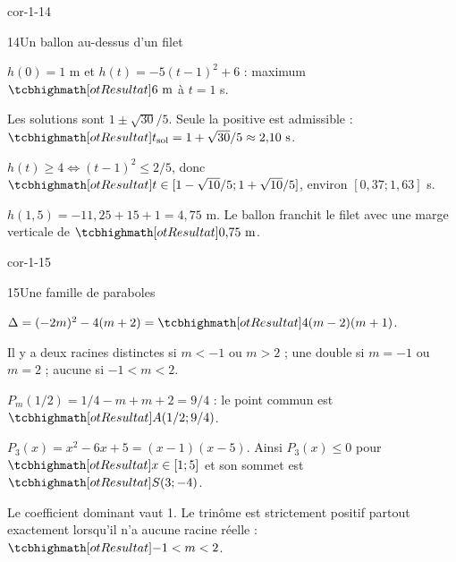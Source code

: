 \begin{blocLivre}{cor-1-14}
\begin{corrige}{14}{Un ballon au-dessus d'un filet}
\begin{questions}
\item $h(0)=1$ m et $h(t)=-5(t-1)^2+6$ : maximum $\res{6\text{ m}}$ à $t=1$ s.
\item Les solutions sont $1\pm\sqrt{30}/5$. Seule la positive est admissible :
$\res{t_{\text{sol}}=1+\sqrt{30}/5\approx2{,}10\text{ s}}$.
\item $h(t)\geq4\iff(t-1)^2\leq2/5$, donc
$\res{t\in[1-\sqrt{10}/5;1+\sqrt{10}/5]}$, environ $[0{,}37;1{,}63]$ s.
\item $h(1{,}5)=-11{,}25+15+1=4{,}75$ m.
Le ballon franchit le filet avec une marge verticale de $\res{0{,}75\text{ m}}$.
\end{questions}
\label{figlivre-r01-14-ballon-cor}

\end{corrige}
\end{blocLivre}
\begin{blocLivre}{cor-1-15}
\begin{corrige}{15}{Une famille de paraboles}
\begin{questions}
\item $\Delta=(-2m)^2-4(m+2)=\res{4(m-2)(m+1)}$.
\item Il y a deux racines distinctes si $m<-1$ ou $m>2$ ; une double si
$m=-1$ ou $m=2$ ; aucune si $-1<m<2$.
\item $P_m(1/2)=1/4-m+m+2=9/4$ : le point commun est $\res{A(1/2;9/4)}$.
\item $P_3(x)=x^2-6x+5=(x-1)(x-5)$. Ainsi $P_3(x)\leq0$ pour
$\res{x\in[1;5]}$ et son sommet est $\res{S(3;-4)}$.
\item Le coefficient dominant vaut 1. Le trinôme est strictement positif
partout exactement lorsqu'il n'a aucune racine réelle : $\res{-1<m<2}$.
\end{questions}
\label{figlivre-r01-15-parametre-cor}

\end{corrige}
\end{blocLivre}
